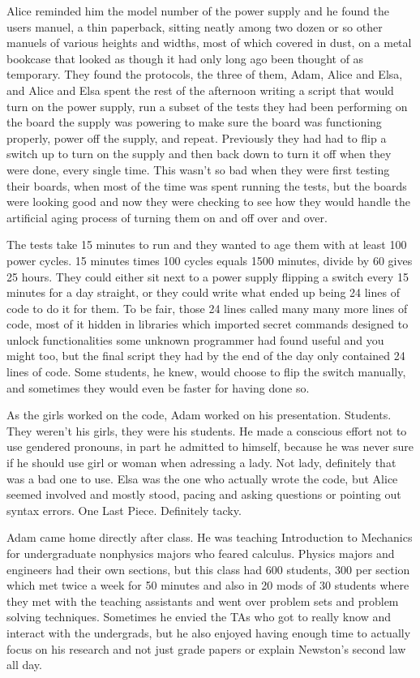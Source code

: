 Alice reminded him the model number of the power supply and he found the users manuel, a thin paperback, sitting neatly among two dozen or so other manuels of various heights and widths, most of which covered in dust, on a metal bookcase that looked as though it had only long ago been thought of as temporary. They found the protocols, the three of them, Adam, Alice and Elsa, and Alice and Elsa spent the rest of the afternoon writing a script that would turn on the power supply, run a subset of the tests they had been performing on the board the supply was powering to make sure the board was functioning properly, power off the supply, and repeat. Previously they had had to flip a switch up to turn on the supply and then back down to turn it off when they were done, every single time. This wasn't so bad when they were first testing their boards, when most of the time was spent running the tests, but the boards were looking good and now they were checking to see how they would handle the artificial aging process of turning them on and off over and over.

The tests take 15 minutes to run and they wanted to age them with at least 100 power cycles. 15 minutes times 100 cycles equals 1500 minutes, divide by 60 gives 25 hours. They could either sit next to a power supply flipping a switch every 15 minutes for a day straight, or they could write what ended up being 24 lines of code to do it for them. To be fair, those 24 lines called many many more lines of code, most of it hidden in libraries which imported secret commands designed to unlock functionalities some unknown programmer had found useful and you might too, but the final script they had by the end of the day only contained 24 lines of code. Some students, he knew, would choose to flip the switch manually, and sometimes they would even be faster for having done so.

As the girls worked on the code, Adam worked on his presentation. Students. They weren't his girls, they were his students. He made a conscious effort not to use gendered pronouns, in part he admitted to himself, because he was never sure if he should use girl or woman when adressing a lady. Not lady, definitely that was a bad one to use. Elsa was the one who actually wrote the code, but Alice seemed involved and mostly stood, pacing and asking questions or pointing out syntax errors. One Last Piece. Definitely tacky. 

\mypause

Adam came home directly after class. He was teaching Introduction to Mechanics for undergraduate nonphysics majors who feared calculus. Physics majors and engineers had their own sections, but this class had 600 students, 300 per section which met twice a week for 50 minutes and also in 20 mods of 30 students where they met with the teaching assistants and went over problem sets and problem solving techniques. Sometimes he envied the TAs who got to really know and interact with the undergrads, but he also enjoyed having enough time to actually focus on his research and not just grade papers or explain Newston's second law all day.

